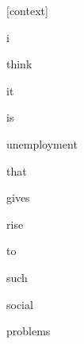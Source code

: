 \documentclass[varwidth]{standalone}
\begin{document}
\begin{CJK*}{UTF8}{gbsn}
{\setlength{\fboxsep}{0pt}\colorbox{white!0}{\parbox{0.9\textwidth}{
\colorbox{red!2.0362494979053736e-05}{\strut [context]} \colorbox{red!0.002608327893540263}{\strut i} \colorbox{red!0.009183038957417011}{\strut think} \colorbox{red!0.00023747589148115367}{\strut it} \colorbox{red!0.00020724060595966876}{\strut is} \colorbox{red!20.821720123291016}{\strut unemployment} \colorbox{red!1.487294316291809}{\strut that} \colorbox{red!1.169283390045166}{\strut gives} \colorbox{red!45.571468353271484}{\strut rise} \colorbox{red!1.3299790620803833}{\strut to} \colorbox{red!1.6394764184951782}{\strut such} \colorbox{red!25.45089340209961}{\strut social} \colorbox{red!2.517636299133301}{\strut problems} 
}}}
\end{CJK*}
\end{document}
